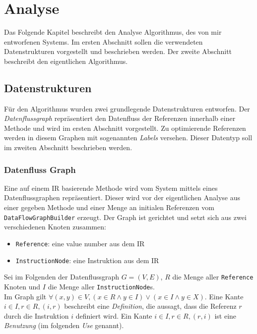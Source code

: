 \chapter{Analyse}

Das Folgende Kapitel beschreibt den Analyse Algorithmus, des von mir entworfenen Systems.
Im ersten Abschnitt sollen die verwendeten Datenstrukturen vorgestellt und beschrieben werden.
Der zweite Abschnitt beschreibt den eigentlichen Algorithmus.

\section{Datenstrukturen}

Für den Algorithmus wurden zwei grundlegende Datenstrukturen entworfen. Der 
\textit{Datenflussgraph} repräsentiert den Datenfluss der Referenzen innerhalb 
einer Methode und wird im ersten Abschnitt vorgestellt. Zu optimierende Referenzen
werden in diesem Graphen mit sogenannten \textit{Labels} versehen. Dieser Datentyp
soll im zweiten Abschnitt beschrieben werden.

\subsection{Datenfluss Graph}

Eine auf einem IR basierende Methode wird vom System mittels eines Datenflussgraphen 
repräsentiert. Dieser wird vor der eigentlichen Analyse aus einer gegeben
Methode und einer Menge an initialen Referenzen vom \texttt{DataFlowGraphBuilder}
erzeugt. Der Graph ist gerichtet und setzt sich aus zwei verschiedenen Knoten zusammen:

\begin{itemize}
	\item \texttt{Reference}: eine value number aus dem IR
	\item \texttt{InstructionNode}: eine Instruktion aus dem IR
\end{itemize}

Sei im Folgenden der Datenflussgraph $G = (V, E)$, $R$ die Menge aller \texttt{Reference} 
Knoten und $I$ die Menge aller \texttt{InstructionNode}s. 
\\
Im Graph gilt $\forall (x, y) \in V,  (x \in R \wedge y \in I) \vee (x \in I \wedge y \in X)$.
Eine Kante $i \in I, r \in R, (i, r)$ beschreibt eine \textit{Definition}, die aussagt, 
dass die Referenz $r$ durch die Instruktion $i$ definiert wird. Ein Kante 
$i \in I, r \in R, (r, i)$ ist eine \textit{Benutzung} (im folgenden \textit{Use}
genannt). 

